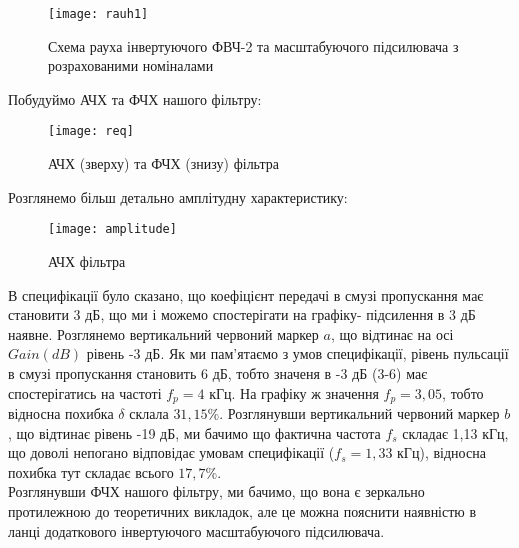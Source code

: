 \documentclass[a4paper,14pt]{extreport}
\begin{document}
\begin{center}
\end{center}

	\begin{figure}[!h]\TopFloatBoxes\CenterFloatBoxes
      {\texttt{[image: rauh1]}}
	\caption{Схема рауха інвертуючого ФВЧ-2 та масштабуючого підсилювача з розрахованими номіналами}
	\end{figure}

\clearpage
\begin{center}
\end{center}
	Побудуймо АЧХ та ФЧХ нашого фільтру:
	\begin{figure}[h]

	{\texttt{[image: req]}}
	\caption{АЧХ (зверху) та ФЧХ (знизу) фільтра}
	\end{figure}
	\newpage
	Розглянемо більш детально амплітудну характеристику:
	\begin{figure}[h]

	{\texttt{[image: amplitude]}}
	\caption{АЧХ фільтра}
	\end{figure}

	В специфікації було сказано, що коефіцієнт передачі в смузі пропускання має становити 3 дБ, що ми і можемо спостерігати на графіку- підсилення в 3 дБ наявне. Розглянемо вертикальний червоний маркер $a$, що відтинає на осі $Gain (dB)$ рівень -3 дБ. Як ми пам'ятаємо з умов специфікації, рівень пульсації в смузі пропускання становить 6 дБ, тобто значеня в -3 дБ (3-6) має спостерігатись на частоті $f_p=4$ кГц. На графіку ж значення $f_p=3,05$, тобто відносна похибка $\delta$ склала $31,15\%$. Розглянувши вертикальний червоний маркер $b$, що відтинає рівень -19 дБ, ми бачимо що фактична частота $f_s$ складає 1,13 кГц, що доволі непогано відповідає умовам специфікації ($f_s=1,33$ кГц), відносна похибка тут складає всього $17,7\%$.\\

	Розглянувши ФЧХ нашого фільтру, ми бачимо, що вона є зеркально протилежною до теоретичних викладок, але це можна пояснити наявністю в ланці додаткового інвертуючого масштабуючого підсилювача.  
\end{document}
